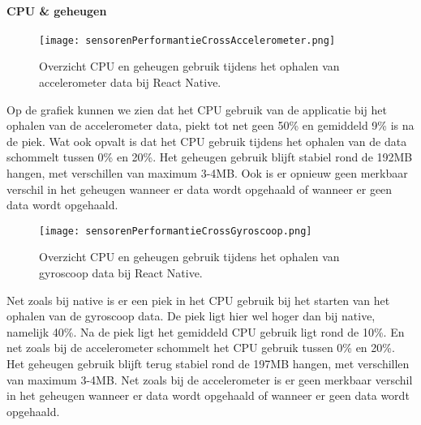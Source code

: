 \paragraph{CPU \& geheugen}
\begin{figure}[H]
    \centering
    \texttt{[image: sensorenPerformantieCrossAccelerometer.png]}
    \caption{Overzicht CPU en geheugen gebruik tijdens het ophalen van accelerometer data bij React Native.}
\end{figure}
Op de grafiek kunnen we zien dat het CPU gebruik van de applicatie bij het ophalen van de accelerometer data,
piekt tot net geen 50\% en gemiddeld 9\% is na de piek. Wat ook opvalt is dat het CPU gebruik tijdens het ophalen 
van de data schommelt tussen 0\% en 20\%. Het geheugen gebruik blijft stabiel rond de 192MB hangen, met verschillen van 
maximum 3-4MB. Ook is er opnieuw geen merkbaar verschil in het 
geheugen wanneer er data wordt opgehaald of wanneer er geen data wordt opgehaald.
\begin{figure}[H]
    \centering
    \texttt{[image: sensorenPerformantieCrossGyroscoop.png]}
    \caption{Overzicht CPU en geheugen gebruik tijdens het ophalen van gyroscoop data bij React Native.}
\end{figure}
Net zoals bij native is er een piek in het CPU gebruik bij het starten van het ophalen van de gyroscoop data. 
De piek ligt hier wel hoger dan bij native, namelijk 40\%. Na de piek ligt het gemiddeld CPU gebruik ligt rond de 10\%. 
En net zoals bij de accelerometer schommelt het CPU gebruik tussen 0\% en 20\%. Het geheugen gebruik blijft terug 
stabiel rond de 197MB hangen, met verschillen van maximum 3-4MB. Net zoals bij de accelerometer is er  
geen merkbaar verschil in het geheugen wanneer er data wordt opgehaald of wanneer er geen 
data wordt opgehaald.